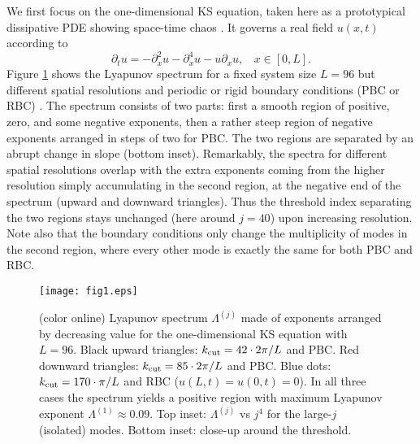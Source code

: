 \documentclass[prl,twocolumn,twoside,showpacs,superscriptaddress]{revtex4}
\newcommand{\p}{\partial}
\begin{document}
We first focus on the one-dimensional KS equation,
taken here as a prototypical dissipative PDE showing space-time chaos
 \cite{Cross_Hohenberg-RMP1993, Chate-ScholarPedia}.
It governs a real field $u(x,t)$ according to
\begin{equation}
 \p_tu = -\p_x^2 u - \p_x^4 u - u \p_x u, ~~~~x \in [0,L] .
\label{eq:KS}
\end{equation}
Figure \ref{fig:KSLyap} shows the Lyapunov spectrum
 for a fixed system size $L = 96$
 but different spatial resolutions and periodic or rigid boundary conditions
(PBC or RBC) \cite{Algorithm}.
The spectrum consists of two parts:
first a smooth region of positive,
 zero, and some negative exponents, then a rather steep
region of negative exponents arranged in steps of two for PBC.
The two regions are separated by an abrupt change in slope
(bottom inset).
Remarkably, the spectra for different spatial resolutions
 overlap with the extra exponents coming from the higher resolution
 simply accumulating in the second region, at the negative end of the spectrum
 (upward and downward triangles).
Thus the threshold index separating the two regions
stays unchanged (here around $j=40$) upon increasing resolution.
Note also that the boundary conditions only change the multiplicity of
 modes in the second region, where every other mode is exactly 
 the same for both PBC and RBC.

\begin{figure}[t]
 \begin{center}
  \texttt{[image: fig1.eps]}
  \caption{(color online) 
Lyapunov spectrum $\Lambda^{(j)}$ made of exponents arranged by decreasing
value for the one-dimensional KS equation with $L = 96$.
Black upward triangles: $k_{\rm cut} = 42 \cdot 2\pi/L$ and PBC. 
Red downward triangles: $k_{\rm cut} = 85 \cdot 2\pi/L$ and PBC.
Blue dots: $k_{\rm cut} = 170 \cdot \pi/L$ and RBC ($u(L,t) = u(0,t) = 0$).
In all three cases the spectrum yields a positive region with maximum Lyapunov 
exponent $\Lambda^{(1)} \approx 0.09$. 
Top inset: $\Lambda^{(j)}$ vs $j^4$ for the large-$j$ (isolated) modes.
Bottom inset:  close-up around the threshold.}
  \label{fig:KSLyap}
 \end{center}
\end{figure}%
\end{document}
